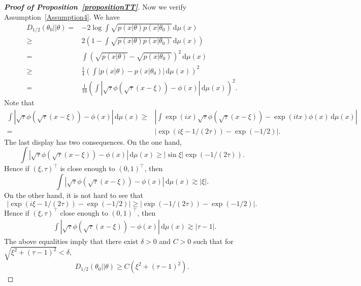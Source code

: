 \documentclass[11pt]{article}
\newcommand{\myT}{\intercal}
\theoremstyle{plain}
\theoremstyle{definition}
\theoremstyle{remark}
\begin{document}
\begin{appendices}
\begin{proof}[\textbf{Proof of Proposition~\ref{propositionTT}}]
Now we verify Assumption~\ref{Assumption4}.
We have
\begin{equation*}
    \begin{split}
    D_{1/2}(\theta_0||\theta)
    =&-2\log \int \sqrt{p(x|\theta)p(x|\theta_0)} \, \mathrm  d\mu (x)
    \\
    \geq&
    2\left(1-\int \sqrt{p(x|\theta)p(x|\theta_0)} \, \mathrm d\mu (x) \right)
    \\
    =&\int \left(\sqrt{p(x|\theta)}-\sqrt{p(x|\theta_0)}\right)^2 \, \mathrm d\mu (x)
    \\
    \geq&
    \frac{1}{4}
    \left(\int \left|p(x|\theta)-p(x|\theta_0)\right| \, \mathrm d\mu (x)\right)^2
    \\
    =&
    \frac{1}{16}
    \left(\int \left|\sqrt{\tau}\phi(\sqrt{\tau}(x-\xi))-\phi(x)\right|   \, \mathrm  d\mu (x)\right)^2
    .
\end{split}
\end{equation*}
Note that
\begin{equation*}
    \begin{split}
        \int \left|\sqrt{\tau}\phi(\sqrt{\tau}(x-\xi))-\phi(x)\right|\, \mathrm d\mu (x)
    \geq &
    \left|\int  \exp(ix)\sqrt{\tau}\phi(\sqrt{\tau}(x-\xi))-\exp(itx)\phi(x) \, \mathrm d\mu (x)\right|
    \\
    =&\left|\exp(i\xi -1 /(2\tau))-\exp(-1/2)\right|.
\end{split}
\end{equation*}
The last display has two consequences.
On the one hand,
\begin{equation*}
    \int \left|\sqrt{\tau}\phi(\sqrt{\tau}(x-\xi))-\phi(x)\right| \, \mathrm d\mu(x)
    \geq
    |\sin \xi |\exp(-1/(2\tau)).
\end{equation*}
Hence if $(\xi, \tau)^\myT $ is close enough to $(0,1)^\myT $, then
\begin{equation*}
    \int \left|\sqrt{\tau}\phi(\sqrt{\tau}(x-\xi))-\phi(x)\right| \, \mathrm d\mu(x)
    \gtrsim |\xi|.
\end{equation*}
On the other hand, 
it is not hard to see that
\begin{equation*}
    \left|\exp(i\xi -1/(2\tau))-\exp(-1/2)\right|
    \geq 
    \left|\exp(-1/(2\tau))-\exp(-1/2)\right|
    .
\end{equation*}
Hence if $(\xi, \tau)^\myT $ close enough to $(0,1)^\myT $, then
\begin{equation*}
    \begin{split}
        &\int \left|\sqrt{\tau}\phi(\sqrt{\tau}(x-\xi))-\phi(x)\right| \, \mathrm d\mu(x)
    \gtrsim |\tau-1|.
\end{split}
\end{equation*}
The above equalities imply that there exist $\delta>0$ and $C>0$ such that for $\sqrt{\xi^2+(\tau-1)^2}<\delta$,
\begin{equation*}
    D_{1/2}(\theta_0||\theta)\geq C (\xi^2+(\tau-1)^2).
\end{equation*}


\end{proof}
\end{appendices}
\end{document}
